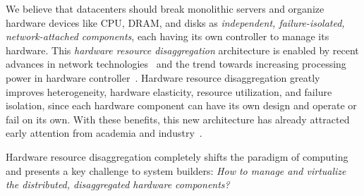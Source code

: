 \documentclass[10pt,times,twocolumn]{z2-article}
\begin{document}
We believe that datacenters should break monolithic servers
and organize hardware devices like CPU, DRAM, and disks 
as {\em independent, failure-isolated, network-attached components},
each having its own controller to manage its hardware.
This {\em hardware resource disaggregation} architecture %
is enabled by recent advances in network technologies~\cite{IB-RTT,GenZ,Mellanox-ConnectX6,OpenCAPI,Omni-Path,ccix} 
and the trend towards increasing processing power in hardware controller~\cite{Willow,Ahn15-PIM,Bojnordi12}.
Hardware resource disaggregation greatly improves heterogeneity, hardware elasticity, 
resource utilization, and failure isolation,
since each hardware component can have its own design and operate or fail on its own.
With these benefits, this new architecture has already attracted early attention 
from academia and industry~\cite{OCP,HP-TheMachine,FireBox-FASTKeynote,Lim09-disaggregate,Nitu18-EUROSYS,dRedBox-DATE}.


Hardware resource disaggregation completely shifts the paradigm of computing
and presents a key challenge to system builders:
{\em How to manage and virtualize the distributed, disaggregated hardware components?}
\end{document}
